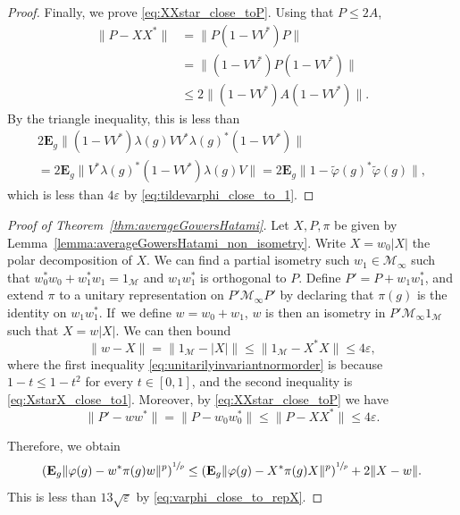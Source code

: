 \documentclass[JEP,XML,SOM,Unicode,published]{cedram}
\theoremstyle{plain}
\theoremstyle{definition}
\newcommand{\cM}{\mathcal{M}}
\newcommand{\E}{\mathbf{E}}
\begin{document}
\begin{proof}
Finally, we prove \eqref{eq:XXstar_close_toP}. Using that $P \leq 2A$,
\begin{align*} \|P - XX^*\| &= \|P(1-VV^*)P\| \\&= \|(1-VV^*)P(1-VV^*)\|\\ &\leq 2 \|(1-VV^*) A (1-VV^*)\|.
\end{align*}
By the triangle inequality, this is less than
\begin{multline*} 2 \E_g \|(1-VV^*) \lambda(g) VV^* \lambda(g)^* (1-VV^*)\|\\ = 2 \E_g \|V^* \lambda(g)^* (1-VV^*) \lambda(g) V\| = 2 \E_g \|1-\tilde{\varphi}(g)^* \tilde\varphi(g)\|,
\end{multline*}
which is less than $4\varepsilon$ by \eqref{eq:tildevarphi_close_to_1}.
\end{proof}
\begin{proof}[Proof of Theorem~\ref{thm:averageGowersHatami}]
Let $X,P,\pi$ be given by Lemma~\ref{lemma:averageGowersHatami_non_isometry}. Write $X = w_0 |X|$ the polar decomposition of $X$. We can find a partial isometry such $w_1 \in \cM_\infty$ such that $w_0^* w_0 +w_1 ^* w_1=1_\cM$ and $w_1 w_1^*$ is orthogonal to $P$. Define $P'=P+w_1 w_1^*$, and extend $\pi$ to a unitary representation on $P'\cM_\infty P'$ by declaring that $\pi(g)$ is the identity on $w_1 w_1^*$. If~we define $w=w_0+w_1$, $w$ is then an isometry in $P' \cM_\infty 1_\cM$ such that $X=w |X|$.
We can then bound\vspace*{-3pt}
\[
\| w-X\| = \|1_\cM - |X|\| \leq \|1_\cM - X^*X\| \leq 4\varepsilon,
\]
where the first inequality \eqref{eq:unitarilyinvariantnormorder} is because $1-t \leq 1-t^2$ for every $t\in[0,1]$, and the second inequality is \eqref{eq:XstarX_close_to1}. Moreover, by \eqref{eq:XXstar_close_toP} we have\vspace*{-3pt}
\[
\|P'-ww^*\| = \|P-w_0 w_0^*\| \leq \|P-X X^*\| \leq 4\varepsilon.
\]

Therefore, we obtain\vspace*{-3pt}
\[
\left(\E_g \|\varphi(g)-w^* \pi(g) w\|^p\right)^{\sfrac 1 p} \leq \left(\E_g \|\varphi(g)-X^* \pi(g) X\|^p\right)^{\sfrac 1 p} + 2 \|X-w\|.
\]
This is less than $13 \sqrt{\varepsilon}$ by \eqref{eq:varphi_close_to_repX}.
\end{proof}
\end{document}
